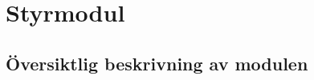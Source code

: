 \documentclass[systemskiss/skiss.tex]{subfiles}
\begin{document}
\section{Styrmodul}
\subsection{Översiktlig beskrivning av modulen}
\end{document}
